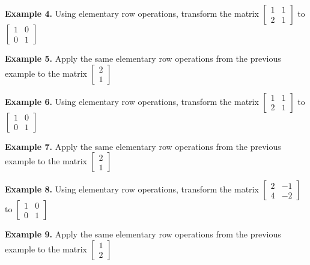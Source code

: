 \documentclass{article}
\begin{document}
\vfill

\newpage

{\color{red}\textbf{Example 4.}} Using elementary row operations, transform the matrix $\begin{bmatrix} 1 & 1 \\ 2 & 1 \end{bmatrix}$ to $\begin{bmatrix} 1 & 0 \\ 0 & 1 \end{bmatrix}$   \vfill

{\color{red}\textbf{Example 5.}} Apply the same elementary row operations from the previous example to the matrix $\begin{bmatrix} 2 \\ 1 \end{bmatrix}$   \vfill

\newpage

{\color{red}\textbf{Example 6.}} Using elementary row operations, transform the matrix $\begin{bmatrix} 1 & 1 \\ 2 & 1 \end{bmatrix}$ to $\begin{bmatrix} 1 & 0 \\ 0 & 1 \end{bmatrix}$  

\vfill

{\color{red}\textbf{Example 7.}} Apply the same elementary row operations from the previous example to the matrix $\begin{bmatrix} 2 \\ 1 \end{bmatrix}$   

\vfill

\newpage

{\color{red}\textbf{Example 8.}} Using elementary row operations, transform the matrix $\begin{bmatrix} 2 & -1 \\ 4 & -2 \end{bmatrix}$ to $\begin{bmatrix} 1 & 0 \\ 0 & 1 \end{bmatrix}$ 
\vfill

{\color{red}\textbf{Example 9.}} Apply the same elementary row operations from the previous example to the matrix $\begin{bmatrix} 1 \\ 2 \end{bmatrix}$   

\vfill


\end{document}
